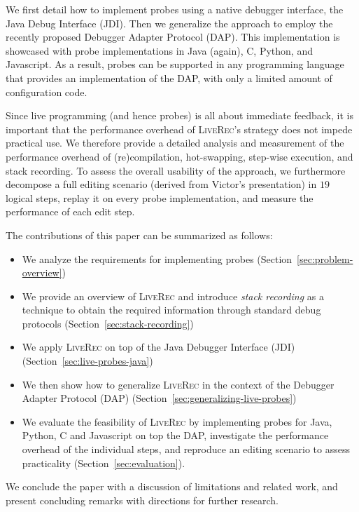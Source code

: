 \documentclass[english,submission]{programming}
\def\coolname{\textsc{LiveRec}\xspace}
\begin{document}
We first detail how to implement probes using a native debugger interface, the Java Debug Interface (JDI). Then we generalize the approach to employ the recently proposed Debugger Adapter Protocol (DAP). 
This implementation is showcased with probe implementations in Java (again), C, Python, and Javascript. 
As a result, probes can be supported in any programming language that provides an implementation of the DAP, with only a limited amount of configuration code.  

Since live programming (and hence probes) is all about immediate feedback, it is important that the performance overhead of \coolname's strategy does not impede practical use. We therefore provide a detailed analysis and measurement of the performance overhead of (re)compilation, hot-swapping, step-wise execution, and stack recording. To assess the overall usability of the approach, we furthermore decompose a full editing scenario (derived from Victor's presentation) in $19$ logical steps, replay it on every  probe implementation, and measure the performance of each edit step.

The contributions of this paper can be summarized as follows:
\begin{itemize}
  \item We analyze the requirements for implementing probes (Section~\ref{sec:problem-overview})
  \item We provide an overview of \coolname and introduce \textit{stack recording} as a technique to obtain the required information through standard debug protocols (Section~\ref{sec:stack-recording})
  \item We apply \coolname on top of the Java Debugger Interface (JDI) (Section~\ref{sec:live-probes-java})
  \item We then show how to generalize \coolname in the context of the Debugger Adapter Protocol (DAP) (Section~\ref{sec:generalizing-live-probes})
   \item We evaluate the feasibility of \coolname by implementing probes for Java, Python, C and Javascript on top the DAP, investigate the performance overhead of the individual steps, and reproduce an editing scenario to assess practicality (Section~\ref{sec:evaluation}).
\end{itemize}
We conclude the paper with a discussion of limitations and related work, and present concluding remarks with directions for further research. 
\end{document}
